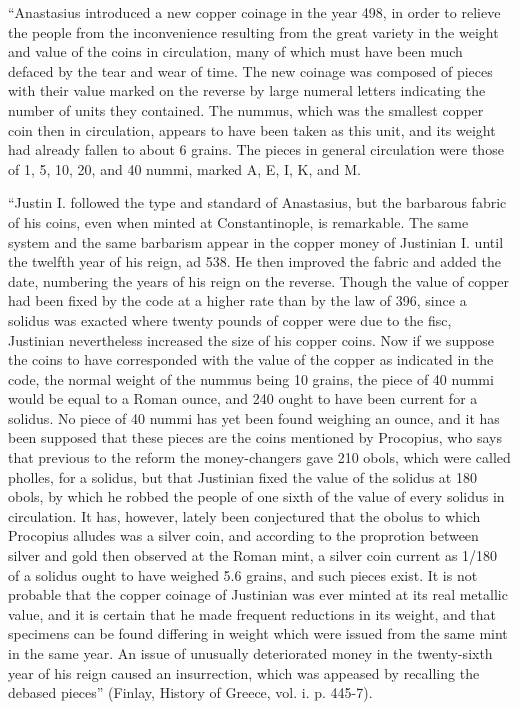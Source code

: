 
\texthebrew{“}Anastasius introduced a new copper coinage in the year 498, in order to relieve the people from the inconvenience resulting from the great variety in the weight and value of the coins in circulation, many of which must have been much defaced by the tear and wear of time. The new coinage was composed of pieces with their value marked on the reverse by large numeral letters indicating the number of units they contained. The nummus, which was the smallest copper coin then in circulation, appears to have been taken as this unit, and its weight had already fallen to about 6 grains. The pieces in general circulation were those of 1, 5, 10, 20, and 40 nummi, marked A, E, I, K, and M.

\texthebrew{“}Justin I. followed the type and standard of Anastasius, but the barbarous fabric of his coins, even when minted at Constantinople, is remarkable. The same system and the same barbarism appear in the copper money of Justinian I. until the twelfth year of his reign, ad 538. He then improved the fabric and added the date, numbering the years of his reign on the reverse. Though the value of copper had been fixed by the code at a higher rate than by the law of 396, since a solidus was exacted where twenty pounds of copper were due to the fisc, Justinian nevertheless increased the size of his copper coins. Now if we suppose the coins to have corresponded with the value of the copper as indicated in the code, the normal weight of the nummus being 10 grains, the piece of 40 nummi would be equal to a Roman ounce, and 240 ought to have been current for a solidus. No piece of 40 nummi has yet been found weighing an ounce, and it has been supposed that these pieces are the coins mentioned by Procopius, who says that previous to the reform the money-changers gave 210 obols, which were called pholles, for a solidus, but that Justinian fixed the value of the solidus at 180 obols, by which he robbed the people of one sixth of the value of every solidus in circulation. It has, however, lately been conjectured that the obolus to which Procopius alludes was a silver coin, and according to the proprotion between silver and gold then observed at the Roman mint, a silver coin current as 1/180 of a solidus ought to have weighed 5.6 grains, and such pieces exist. It is not probable that the copper coinage of Justinian was ever minted at its real metallic value, and it is certain that he made frequent reductions in its weight, and that specimens can be found differing in weight which were issued from the same mint in the same year. An issue of unusually deteriorated money in the twenty-sixth year of his reign caused an insurrection, which was appeased by recalling the debased pieces\texthebrew{}” (Finlay, History of Greece, vol. i. p. 445-7).

